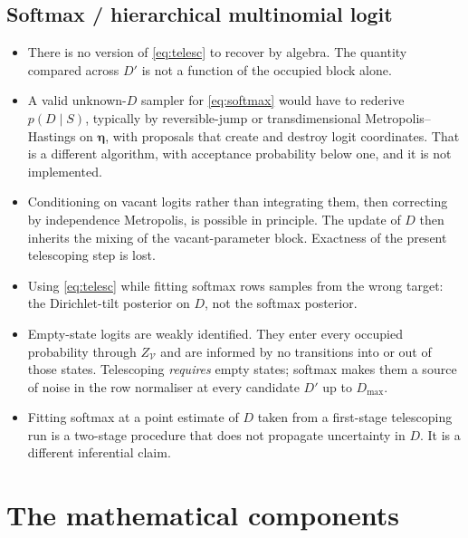\documentclass[11pt,a4paper]{article}
\newcommand{\bs}{\boldsymbol}
\newcommand{\Dmax}{D_{\max}}
\theoremstyle{plain}
\theoremstyle{definition}
\theoremstyle{remark}
\begin{document}
\subsection*{Softmax / hierarchical multinomial logit}

\begin{itemize}
\item There is no version of \eqref{eq:telesc} to recover by algebra. The
quantity compared across $D'$ is not a function of the occupied block
alone.
\item A valid unknown-$D$ sampler for \eqref{eq:softmax} would have to
rederive $p(D\mid S)$, typically by reversible-jump or transdimensional
Metropolis--Hastings on $\bs\eta$, with proposals that create and destroy
logit coordinates. That is a different algorithm, with acceptance
probability below one, and it is not implemented.
\item Conditioning on vacant logits rather than integrating them, then
correcting by independence Metropolis, is possible in principle. The
update of $D$ then inherits the mixing of the vacant-parameter block.
Exactness of the present telescoping step is lost.
\item Using \eqref{eq:telesc} while fitting softmax rows samples from the
wrong target: the Dirichlet-tilt posterior on $D$, not the softmax
posterior.
\item Empty-state logits are weakly identified. They enter every occupied
probability through $Z_{\mathcal V}$ and are informed by no transitions
into or out of those states. Telescoping \emph{requires} empty states;
softmax makes them a source of noise in the row normaliser at every
candidate $D'$ up to $\Dmax$.
\item Fitting softmax at a point estimate of $D$ taken from a first-stage
telescoping run is a two-stage procedure that does not propagate
uncertainty in $D$. It is a different inferential claim.
\end{itemize}

\section{The mathematical components}
\end{document}
